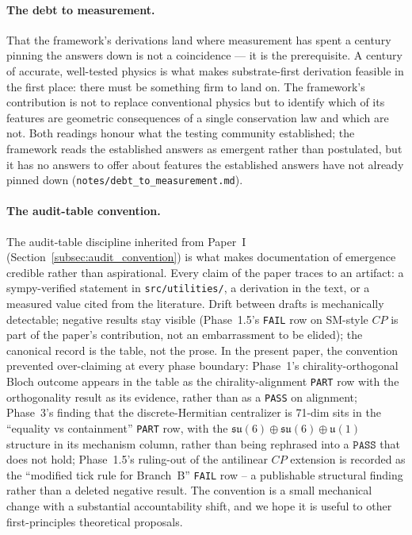 \paragraph{The debt to measurement.}  That the framework's
derivations land where measurement has spent a century pinning
the answers down is not a coincidence --- it is the prerequisite.
A century of accurate, well-tested physics is what makes
substrate-first derivation feasible in the first place: there
must be something firm to land on.  The framework's contribution
is not to replace conventional physics but to identify which of
its features are geometric consequences of a single conservation
law and which are not.  Both readings honour what the testing
community established; the framework reads the established answers
as emergent rather than postulated, but it has no answers to
offer about features the established answers have not already
pinned down (\nolinkurl{notes/debt_to_measurement.md}).

\paragraph{The audit-table convention.}  The audit-table discipline
inherited from Paper~I (Section~\ref{subsec:audit_convention}) is
what makes documentation of emergence credible rather than
aspirational.  Every claim of the paper traces to an artifact:
a sympy-verified statement in \nolinkurl{src/utilities/}, a
derivation in the text, or a measured value cited from the
literature.  Drift between drafts is mechanically detectable;
negative results stay visible (Phase~1.5's \texttt{FAIL} row on
SM-style $CP$ is part of the paper's contribution, not an
embarrassment to be elided); the canonical record is the table,
not the prose.  In the present paper, the convention prevented over-claiming at
every phase boundary: Phase~1's chirality-orthogonal Bloch outcome
appears in the table as the chirality-alignment \texttt{PART} row
with the orthogonality result as its evidence, rather than as a
\texttt{PASS} on alignment; Phase~3's finding that the
discrete-Hermitian centralizer is 71-dim sits in the
``equality vs containment'' \texttt{PART} row, with the
$\mathfrak{su}(6) \oplus \mathfrak{su}(6) \oplus \mathfrak{u}(1)$
structure in its mechanism column, rather than being rephrased
into a $\texttt{PASS}$ that does not hold; Phase~1.5's
ruling-out of the antilinear $CP$ extension is recorded as the
``modified tick rule for Branch~B'' \texttt{FAIL} row -- a
publishable structural finding rather than a deleted negative
result.  The convention is a small mechanical change with a
substantial accountability shift, and we hope it is useful to
other first-principles theoretical proposals.

